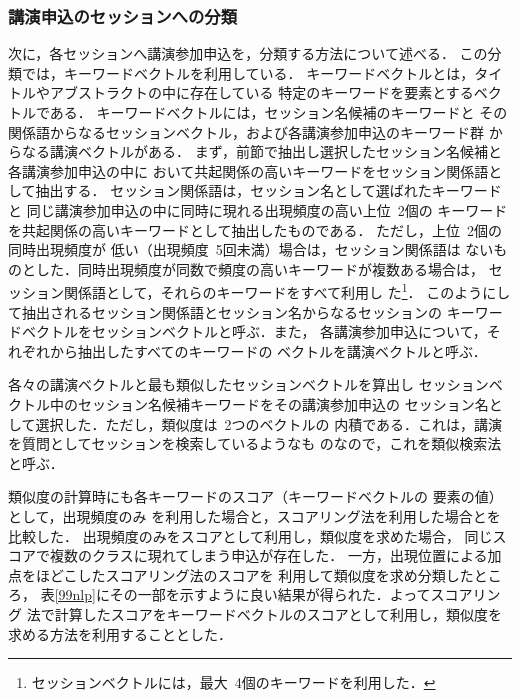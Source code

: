 \subsubsection{講演申込のセッションへの分類}
\label{bunbun}
次に，各セッションへ講演参加申込を，分類する方法について述べる．
この分類では，キーワードベクトルを利用している．
キーワードベクトルとは，タイトルやアブストラクトの中に存在している
特定のキーワードを要素とするベクトルである．
キーワードベクトルには，セッション名候補のキーワードと
その関係語からなるセッションベクトル，および各講演参加申込のキーワード群
からなる講演ベクトルがある．
まず，前節で抽出し選択したセッション名候補と各講演参加申込の中に
おいて共起関係の高いキーワードをセッション関係語として抽出する．
セッション関係語は，セッション名として選ばれたキーワードと
同じ講演参加申込の中に同時に現れる出現頻度の高い上位\ 2個の
キーワードを共起関係の高いキーワードとして抽出したものである．
ただし，上位\ 2個の同時出現頻度が
低い（出現頻度\ 5回未満）場合は，セッション関係語は
ないものとした．同時出現頻度が同数で頻度の高いキーワードが複数ある場合は，
セッション関係語として，それらのキーワードをすべて利用し
た\footnote{セッションベクトルには，最大\ 4個のキーワードを利用した．}．
このようにして抽出されるセッション関係語とセッション名からなるセッションの
キーワードベクトルをセッションベクトルと呼ぶ．また，
各講演参加申込について，それぞれから抽出したすべてのキーワードの
ベクトルを講演ベクトルと呼ぶ．

各々の講演ベクトルと最も類似したセッションベクトルを算出し
セッションベクトル中のセッション名候補キーワードをその講演参加申込の
セッション名として選択した．ただし，類似度は\ 2つのベクトルの
内積である．これは，講演を質問としてセッションを検索しているようなも
のなので，これを類似検索法と呼ぶ．

類似度の計算時にも各キーワードのスコア（キーワードベクトルの
要素の値）として，出現頻度のみ
を利用した場合と，スコアリング法を利用した場合とを比較した．
出現頻度のみをスコアとして利用し，類似度を求めた場合，
同じスコアで複数のクラスに現れてしまう申込が存在した．
一方，出現位置による加点をほどこしたスコアリング法のスコアを
利用して類似度を求め分類したところ，
表\ref{99nlp}にその一部を示すように良い結果が得られた．よってスコアリング
法で計算したスコアをキーワードベクトルのスコアとして利用し，類似度を
求める方法を利用することとした．

